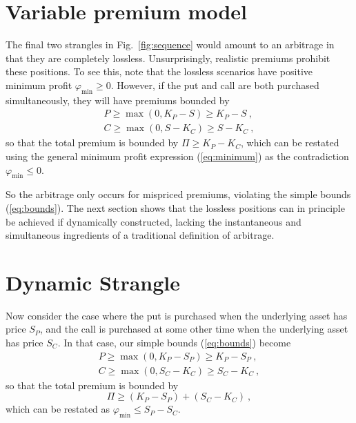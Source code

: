 \documentclass[aps,reprint]{revtex4-2}
\begin{document}
\section{Variable premium model}

The final two strangles in Fig.~\ref{fig:sequence} would amount to an arbitrage in that they are completely lossless.  Unsurprisingly, realistic premiums prohibit these positions.  To see this, note that the lossless scenarios have positive minimum profit  $\varphi_{\min} \ge 0$.
However, if the put and call are both purchased simultaneously, they will have premiums bounded by 
\begin{subequations} \label{eq:bounds}
\begin{align}
P \ge \max(0, K_P - S) \ge K_P - S~,\\
C \ge \max(0, S - K_C) \ge S - K_C~,
\end{align}
\end{subequations}
so that the total premium is bounded by $\Pi \ge K_P - K_C$, which can be restated using the general minimum profit expression (\ref{eq:minimum}) as the contradiction $\varphi_{\min} \le 0$.

So the arbitrage only occurs for mispriced premiums, violating the simple bounds (\ref{eq:bounds}).  The next section shows that the lossless positions can in principle be achieved if dynamically constructed, lacking the instantaneous and simultaneous ingredients of a traditional definition of arbitrage.

\section{Dynamic Strangle}
Now consider the case where the put is purchased when the underlying asset has price $S_P$, and the call is purchased at some other time when the underlying asset has price $S_C$.  In that case, our simple bounds (\ref{eq:bounds}) become
\begin{subequations} \label{eq:dynamicbounds}
\begin{align}
P \ge \max(0, K_P - S_P) \ge K_P - S_P~,\\
C \ge \max(0, S_C - K_C) \ge S_C - K_C~,
\end{align}
\end{subequations}
so that the total premium is bounded by
\begin{equation}
\Pi \ge (K_P - S_P) + (S_C - K_C)~,
\end{equation}
which can be restated as $\varphi_{\min} \le S_P - S_C$.
\end{document}
